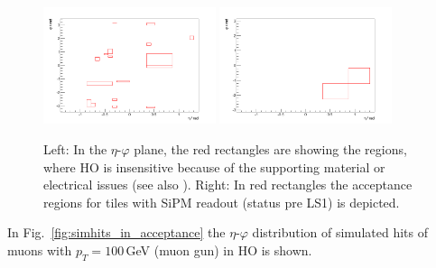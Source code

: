 			\begin{figure}[htbp]
				\centering
				\includegraphics[width=0.45\textwidth]{Figures/erdogan/deadregions.png}
				\includegraphics[width=0.45\textwidth]{Figures/erdogan/sipmregions.png}
				\caption{Left: In the $\eta$-$\varphi$ plane, the red rectangles are showing the regions, where HO is insensitive because of the supporting material or electrical issues (see also \cite{JINST}).
				Right: In red rectangles the acceptance regions for tiles with SiPM readout (status pre LS1) is depicted.}
				\label{fig:ho_acceptance}
			\end{figure}
			In Fig.\ \ref{fig:simhits_in_acceptance} the $\eta$-$\varphi$ distribution of simulated hits of muons with $p_T = 100$\,GeV (muon gun) in HO is shown.
